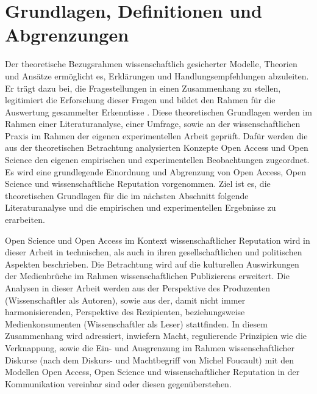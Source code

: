 \chapter{Grundlagen, Definitionen und Abgrenzungen} 

Der theoretische Bezugsrahmen wissenschaftlich gesicherter Modelle, Theorien und Ansätze ermöglicht es, Erklärungen und Handlungsempfehlungen abzuleiten\cite{martin_2007_wissenschaftstheorie}. Er trägt dazu bei, die Fragestellungen in einen Zusammenhang zu stellen, legitimiert die Erforschung dieser Fragen und bildet den Rahmen für die Auswertung gesammelter Erkenntisse \cite{suchen}. 
Diese theoretischen Grundlagen werden im Rahmen einer Literaturanalyse, einer Umfrage, sowie an der wissenschaftlichen Praxis im Rahmen der eigenen experimentellen Arbeit geprüft. Dafür werden die aus der theoretischen Betrachtung analysierten Konzepte Open Access und Open Science den eigenen empirischen und experimentellen Beobachtungen zugeordnet. Es wird eine grundlegende Einordnung und Abgrenzung von Open Access, Open Science und wissenschaftliche Reputation vorgenommen. Ziel ist es, die theoretischen Grundlagen für die im nächsten Abschnitt folgende Literaturanalyse und die empirischen und experimentellen Ergebnisse zu erarbeiten. 

Open Science und Open Access im Kontext wissenschaftlicher Reputation wird in dieser Arbeit in technischen, als auch in ihren gesellschaftlichen und politischen Aspekten beschrieben. Die Betrachtung wird auf die kulturellen Auswirkungen der Medienbrüche im Rahmen wissenschaftlichen Publizierens erweitert. Die Analysen in dieser Arbeit werden aus der Perspektive des Produzenten (Wissenschaftler als Autoren), sowie aus der, damit nicht immer harmonisierenden, Perspektive des Rezipienten, beziehungsweise Medienkonsumenten (Wissenschaftler als Leser) stattfinden. In diesem Zusammenhang wird adressiert, inwiefern Macht, regulierende Prinzipien wie die Verknappung, sowie die Ein- und Ausgrenzung im Rahmen wissenschaftlicher Diskurse (nach dem Diskurs- und Machtbegriff von Michel Foucault) mit den Modellen Open Access, Open Science und wissenschaftlicher Reputation in der Kommunikation vereinbar sind oder diesen gegenüberstehen. 

